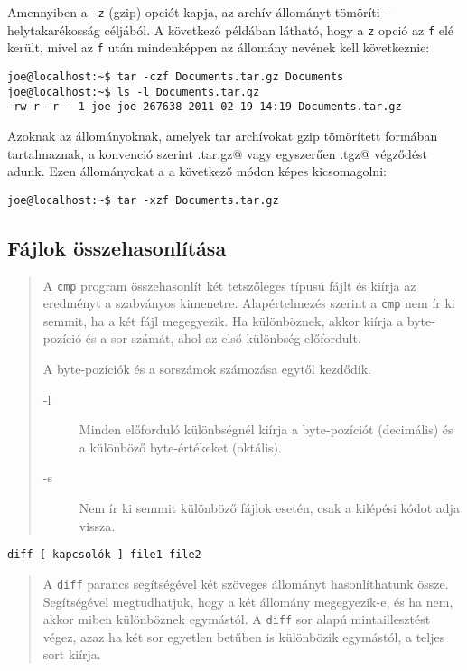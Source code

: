 Amennyiben a \verb.-z. (gzip) opciót kapja, az archív állományt tömöríti -- helytakarékosság céljából. A következő példában látható, hogy a \verb.z. opció az \verb.f. elé került, mivel az \verb.f. után mindenképpen az állomány nevének kell következnie:
\begin{lstlisting}
joe@localhost:~$ tar -czf Documents.tar.gz Documents
joe@localhost:~$ ls -l Documents.tar.gz 
-rw-r--r-- 1 joe joe 267638 2011-02-19 14:19 Documents.tar.gz
\end{lstlisting}
Azoknak az állományoknak, amelyek tar archívokat gzip tömörített formában tartalmaznak, a konvenció szerint \verb@.tar.gz@ vagy egyszerűen
\verb@.tgz@ végződést adunk. Ezen állományokat a \verb@tar@ a következő módon képes kicsomagolni:
\begin{lstlisting}
joe@localhost:~$ tar -xzf Documents.tar.gz
\end{lstlisting}


\subsection{Fájlok összehasonlítása}
\noindent{}


\begin{quotation}
     A \texttt{cmp} program összehasonlít két tetszőleges típusú fájlt és kiírja az
     eredményt a szabványos kimenetre.  Alapértelmezés szerint a \texttt{cmp} nem ír ki
     semmit, ha a két fájl megegyezik. Ha különböznek, akkor kiírja a byte-
     pozíció és a sor számát, ahol az első különbség előfordult.

     A byte-pozíciók és a sorszámok számozása egytől kezdődik.

  \begin{description}
    \item[-l]    Minden előforduló különbségnél kiírja a byte-pozíciót (decimális)
           és a különböző byte-értékeket (oktális).
     \item[-s]    Nem ír ki semmit különböző fájlok esetén, csak a kilépési kódot
           adja vissza.           
   \end{description}
\end{quotation}


\noindent{}
  \hfill\texttt{diff [ kapcsolók ] file1 file2} 

\begin{quotation}
A \texttt{diff} parancs segítségével két szöveges állományt hasonlíthatunk össze. Segítségével megtudhatjuk, hogy a két állomány megegyezik-e, és ha nem, akkor miben különböznek egymástól. 
%
A \texttt{diff} sor alapú mintaillesztést végez, azaz ha két sor egyetlen betűben is különbözik egymástól, a teljes sort kiírja. 
\end{quotation}





